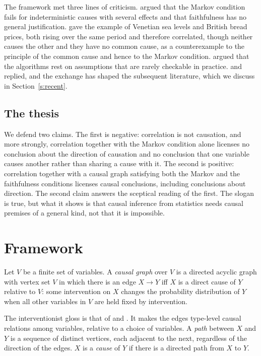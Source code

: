 \documentclass{situationist-preprint}
\begin{document}
The framework met three lines of criticism. \citet{Cartwright1999,Cartwright2007} argued that the Markov condition fails for indeterministic causes with several effects and that faithfulness has no general justification. \citet{Sober2001} gave the example of Venetian sea levels and British bread prices, both rising over the same period and therefore correlated, though neither causes the other and they have no common cause, as a counterexample to the principle of the common cause and hence to the Markov condition. \citet{Freedman1999} argued that the algorithms rest on assumptions that are rarely checkable in practice. \citet{Hausman1999} and \citet{Glymour2010} replied, and the exchange has shaped the subsequent literature, which we discuss in Section~\ref{s:recent}.

\subsection{The thesis}

We defend two claims. The first is negative: correlation is not causation, and more strongly, correlation together with the Markov condition alone licenses no conclusion about the direction of causation and no conclusion that one variable causes another rather than sharing a cause with it. The second is positive: correlation together with a causal graph satisfying both the Markov and the faithfulness conditions licenses causal conclusions, including conclusions about direction. The second claim answers the sceptical reading of the first. The slogan is true, but what it shows is that causal inference from statistics needs causal premises of a general kind, not that it is impossible.

\section{Framework}\label{s:framework}

\begin{definition}\label{d:graph}
Let $V$ be a finite set of variables. A \emph{causal graph} over $V$ is a directed acyclic graph with vertex set $V$ in which there is an edge $X \to Y$ iff $X$ is a direct cause of $Y$ relative to $V$: some intervention on $X$ changes the probability distribution of $Y$ when all other variables in $V$ are held fixed by intervention.
\end{definition}

The interventionist gloss is that of \citet{Woodward2003} and \citet{Pearl2009}. It makes the edges type-level causal relations among variables, relative to a choice of variables. A \emph{path} between $X$ and $Y$ is a sequence of distinct vertices, each adjacent to the next, regardless of the direction of the edges. $X$ is a \emph{cause} of $Y$ if there is a directed path from $X$ to $Y$.
\end{document}
